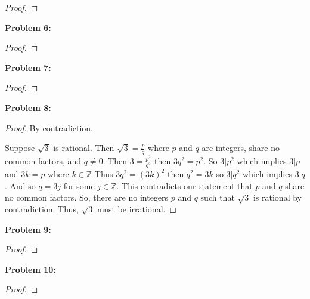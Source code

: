 \documentclass{article}
\begin{document}
    \begin{proof}
        
    \end{proof}


    \textbf{Problem 6:}

    \begin{proof}
        
    \end{proof}


    \textbf{Problem 7:}

    \begin{proof}
        
    \end{proof}


    \textbf{Problem 8:}

    \begin{proof}
        By contradiction. 
        
        Suppose $\sqrt{3}$ is rational. Then $\sqrt{3} = \frac{p}{q}$
        where $p$ and $q$ are integers, share no common factors, and $q\neq 0$. Then
        $3=\frac{p^2}{q^2}$ then $3q^2=p^2$. So $3|p^2$ which implies $3|p$ and $3k=p$
        where $k \in\mathbb{Z}$ Thus $3q^2=(3k)^2$ then $q^2=3k$ so $3|q^2$ which implies
        $3|q$. And so $q=3j$ for some $j\in\mathbb{Z}$.
        This contradicts our statement that $p$ and $q$ share no common factors. So, there 
        are no integers $p$ and $q$ such that $\sqrt{3}$ is rational by contradiction. Thus,
        $\sqrt{3}$ must be irrational.

    \end{proof}


    \textbf{Problem 9:}

    \begin{proof}
        
    \end{proof}


    \textbf{Problem 10:}

    \begin{proof}
        
    \end{proof}

    
\end{document}
